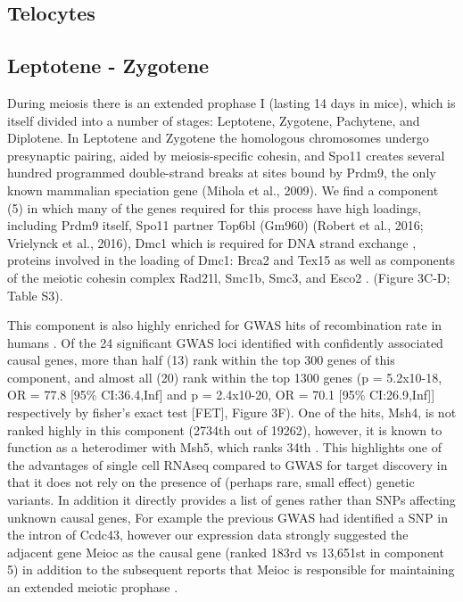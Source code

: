 \subsection{Telocytes}

\subsection{Leptotene - Zygotene}

During meiosis there is an extended prophase I (lasting 14 days in mice), which is itself divided into a number of stages: Leptotene, Zygotene, Pachytene, and Diplotene. In Leptotene and Zygotene the homologous chromosomes undergo presynaptic pairing, aided by meiosis-specific cohesin, and Spo11 creates several hundred programmed double-strand breaks at sites bound by Prdm9, the only known mammalian speciation gene (Mihola et al., 2009). We find a component (5) in which many of the genes required for this process have high loadings, including Prdm9 itself, Spo11 partner Top6bl (Gm960) (Robert et al., 2016; Vrielynck et al., 2016), Dmc1 which is required for DNA strand exchange \cite{Brown2014-wg}, proteins involved in the loading of Dmc1: Brca2 \cite{Martinez2016-qj} and Tex15 \cite{Yang2008-nj} as well as  components of the meiotic cohesin complex Rad21l, Smc1b, Smc3, and Esco2 \cite{Rankin2015-jz}. (Figure 3C-D; Table S3).

This component is also highly enriched for GWAS hits of recombination rate in humans \cite{Halldorsson2019-vk}. Of the 24 significant GWAS loci identified with confidently associated causal genes, more than half (13) rank within the top 300 genes of this component, and almost all (20) rank within the top 1300 genes (p = 5.2x10-18, OR = 77.8 [95\% CI:36.4,Inf] and p = 2.4x10-20, OR = 70.1 [95\% CI:26.9,Inf]] respectively by fisher's exact test [FET], Figure 3F). One of the hits, Msh4, is not ranked highly in this component (2734th out of 19262), however, it is known to function as a heterodimer with Msh5, which ranks 34th \cite{Rakshambikai2013-qi}. This highlights one of the advantages of single cell RNAseq compared to GWAS for target discovery in that it does not rely on the presence of (perhaps rare, small effect) genetic variants. In addition it directly provides a list of genes rather than SNPs affecting unknown causal genes, For example the previous GWAS had identified a SNP in the intron of Ccdc43, however our expression data strongly suggested the adjacent gene Meioc as the causal gene (ranked 183rd vs 13,651st in component 5) in addition to the subsequent reports that Meioc is responsible for maintaining an extended meiotic prophase \cite{Abby2016-kc, Kong2014-ae, Soh2017-vq}. 

